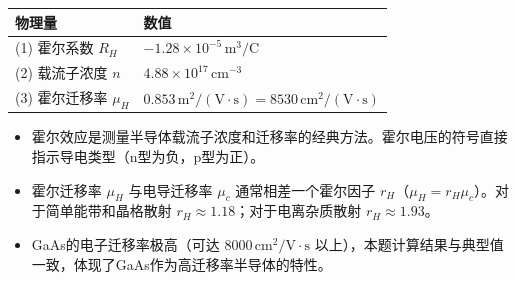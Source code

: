 \begin{formulabox}[答案汇总]
\begin{center}
\begin{tabular}{ll}
\toprule
\textbf{物理量} & \textbf{数值} \\
\midrule
(1) 霍尔系数 $R_H$ & $-1.28\times10^{-5}\,\text{m}^3/\text{C}$ \\
(2) 载流子浓度 $n$ & $4.88\times10^{17}\,\text{cm}^{-3}$ \\
(3) 霍尔迁移率 $\mu_H$ & $0.853\,\text{m}^2/(\text{V}\cdot\text{s})=8530\,\text{cm}^2/(\text{V}\cdot\text{s})$ \\
\bottomrule
\end{tabular}
\end{center}
\end{formulabox}

\begin{insightbox}[物理图像]
\begin{itemize}
    \item 霍尔效应是测量半导体载流子浓度和迁移率的经典方法。霍尔电压的符号直接指示导电类型（n型为负，p型为正）。
    \item 霍尔迁移率 $\mu_H$ 与电导迁移率 $\mu_c$ 通常相差一个霍尔因子 $r_H$（$\mu_H=r_H\mu_c$）。对于简单能带和晶格散射 $r_H\approx1.18$；对于电离杂质散射 $r_H\approx1.93$。
    \item GaAs的电子迁移率极高（可达 $8000\,\text{cm}^2/\text{V}\cdot\text{s}$ 以上），本题计算结果与典型值一致，体现了GaAs作为高迁移率半导体的特性。
\end{itemize}
\end{insightbox}
